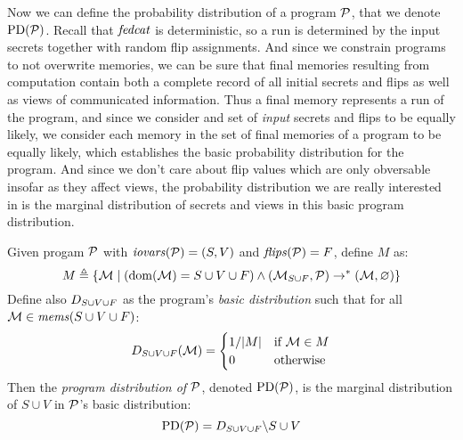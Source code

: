 Now we can define the probability distribution of a program $\mathcal{P}$,
that we denote $\mathrm{PD}(\mathcal{P})$. Recall that $\mathit{fedcat}$ is
deterministic, so a run is determined by the input secrets together
with random flip assignments. And since we constrain programs to not
overwrite memories, we can be sure that final memories resulting from
computation contain both a complete record of all initial secrets and
flips as well as views of communicated information. Thus a final
memory represents a run of the program, and since we consider and set
of \emph{input} secrets and flips to be equally likely, we consider
each memory in the set of final memories of a program to be equally
likely, which establishes the basic probability distribution for the
program. And since we don't care about flip values which are only
obversable insofar as they affect views, the probability distribution
we are really interested in is the marginal distribution of secrets
and views in this basic program distribution.
\begin{definition}
  Given progam $\mathcal{P}$ with $\mathit{iovars}(\mathcal{P}) = (S,V)$ and $\mathit{flips}(\mathcal{P}) = F$, define $M$ as:
  $$
  M \triangleq \{ \mathcal{M} \mid (\mathrm{dom}(\mathcal{M}) = S \cup V \cup F) \wedge (\mathcal{M}_{S \cup F},\mathcal{P}) \rightarrow^* (\mathcal{M},\varnothing) \}
  $$
  Define also $D_{S \cup V \cup F}$ as the program's \emph{basic distribution} such that for all
  $\mathcal{M} \in \mathit{mems}(S \cup V \cup F)$:
  $$
  D_{S \cup V \cup F}(\mathcal{M}) =
  \begin{cases}
    1 / |M| & \text{if}\ \mathcal{M} \in M\\
    0 & \text{otherwise}
  \end{cases}
  $$
  Then the \emph{program distribution of $\mathcal{P}$}, denoted $\mathrm{PD}(\mathcal{P})$, is the
  marginal distribution of $S \cup V$ in $\mathcal{P}$'s basic distribution:
  $$
  \mathrm{PD}(\mathcal{P}) =  D_{S \cup V \cup F}\backslash S\cup V
  $$
\end{definition}
